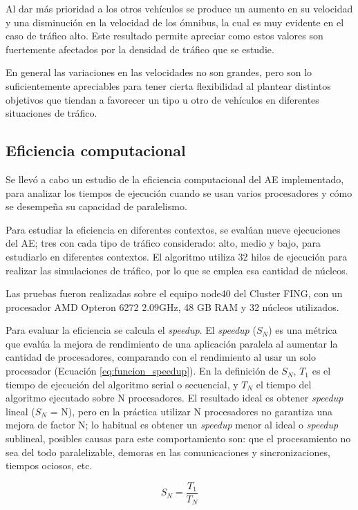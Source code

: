 Al dar más prioridad a los otros vehículos se produce un aumento en su velocidad y una disminución en la velocidad de los ómnibus, la cual es muy evidente en el caso de tráfico alto. Este resultado permite apreciar como estos valores son fuertemente afectados por la densidad de tráfico que se estudie.

En general las variaciones en las velocidades no son grandes, pero son lo suficientemente apreciables para tener cierta flexibilidad al plantear distintos objetivos que tiendan a favorecer un tipo u otro de vehículos en diferentes situaciones de tráfico.


\subsection{Eficiencia computacional}

Se llevó a cabo un estudio de la eficiencia computacional del AE implementado, para analizar los tiempos de ejecución cuando se usan varios procesadores y cómo se desempeña su capacidad de paralelismo.

Para estudiar la eficiencia en diferentes contextos, se evalúan nueve ejecuciones del AE; tres con cada tipo de tráfico considerado: alto, medio y bajo, para estudiarlo en diferentes contextos. El algoritmo utiliza 32 hilos de ejecución para realizar las simulaciones de tráfico,	 por lo que se emplea esa cantidad de núcleos.

Las pruebas fueron realizadas sobre el equipo node40 del Cluster FING, con un procesador AMD Opteron 6272 2.09GHz, 48 GB RAM y 32 núcleos utilizados.

Para evaluar la eficiencia se calcula el \emph{speedup}. El \emph{speedup} (${S_N}$) es una métrica que evalúa la mejora de rendimiento de una aplicación paralela al aumentar la cantidad de procesadores, comparando con el rendimiento al usar un solo procesador (Ecuación \ref{eq:funcion_speedup}). En la definición de ${S_N}$, ${T_1}$ es el tiempo de ejecución del algoritmo serial o secuencial, y ${T_N}$ el tiempo del algoritmo ejecutado sobre N procesadores. El resultado ideal es obtener \emph{speedup} lineal (${S_N}$ = N), pero en la práctica utilizar N procesadores no garantiza una mejora de factor N; lo habitual es obtener un \emph{speedup} menor al ideal o \emph{speedup} sublineal, posibles causas para este comportamiento son: que el procesamiento no sea del todo paralelizable, demoras en las comunicaciones y sincronizaciones, tiempos ociosos, etc.

\begin{equation}
\label{eq:funcion_speedup}
{S_N} = \frac{T_1}{T_N}
\end{equation}



